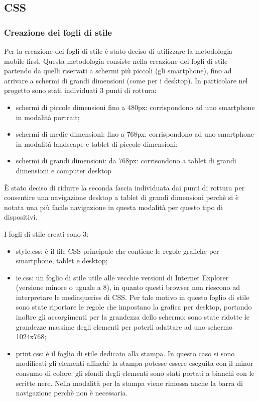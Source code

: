 \subsection{CSS}
\subsubsection{Creazione dei fogli di stile}

Per la creazione dei fogli di stile è stato deciso di utilizzare la metodologia mobile-first.
Questa metodologia consiste nella creazione dei fogli di stile partendo da quelli riservati a schermi più piccoli (gli smartphone), fino ad arrivare a schermi di grandi dimensioni (come per i desktop).
In particolare nel progetto sono stati individuati 3 punti di rottura:
\begin{itemize}

    \item schermi di piccole dimensioni fino a 480px: corrispondono ad uno smartphone in modalità portrait;
    \item schermi di medie dimensioni: fino a 768px: corrispondono ad uno smartphone in modalità landscape e tablet di piccole dimensioni;
    \item schermi di grandi dimensioni: da 768px: corrisondono a tablet di grandi dimensioni e computer desktop

\end{itemize}

\`E stato deciso di ridurre la seconda fascia individuata dai punti di rottura per consentire una navigazione desktop a tablet di grandi dimensioni perchè si è notata una più facile navigazione in questa modalità per questo tipo di dispositivi.

I fogli di stile creati sono 3:
\begin{itemize}

    \item style.css: è il file CSS principale che contiene le regole grafiche per smartphone, tablet e desktop;
    \item ie.css:  un foglio di stile utile alle vecchie versioni di Internet Explorer (versione minore o uguale a 8), in quanto questi browser non riescono ad interpretare le mediaqueries di CSS. Per tale motivo in questo foglio di stile sono state riportare le regole che impostano la grafica per desktop, portando inoltre gli accorgimenti per la grandezza dello schermo: sono state ridotte le grandezze massime degli elementi per poterli adattare ad uno schermo 1024x768;
    \item print.css: è il foglio di stile dedicato alla stampa. In questo caso si sono modificati gli elementi affinchè la stampa potesse essere eseguita con il minor consumo di colore: gli sfondi degli elementi sono stati portati a bianchi con le scritte nere. Nella modalità per la stampa viene rimossa anche la barra di navigazione perchè non è necessaria.

\end{itemize}


